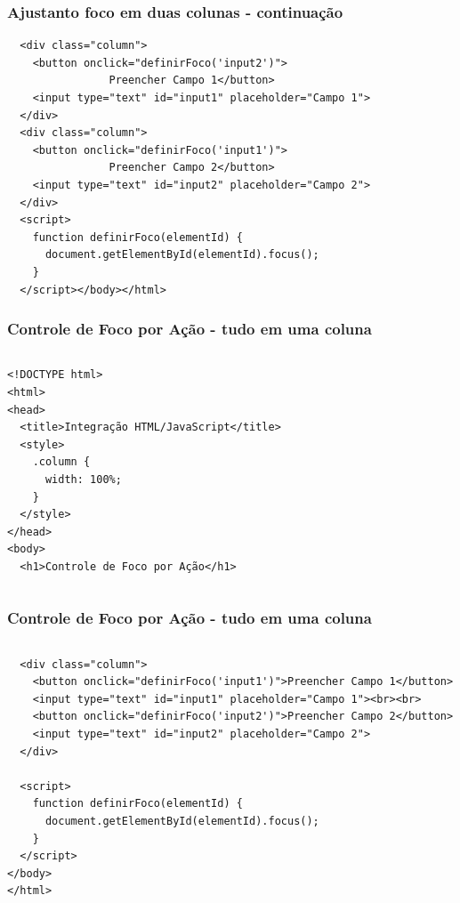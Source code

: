 \documentclass[13pt, xcolor={dvipsnames,svgnames}, portuguese]{beamer}
\begin{document}


\begin{frame}[fragile]
\frametitle{Ajustanto foco em duas colunas - continuação}

\begin{verbatim}
  <div class="column">
    <button onclick="definirFoco('input2')">
    			Preencher Campo 1</button>
    <input type="text" id="input1" placeholder="Campo 1">
  </div>
  <div class="column">
    <button onclick="definirFoco('input1')">
    			Preencher Campo 2</button>
    <input type="text" id="input2" placeholder="Campo 2">
  </div>
  <script>
    function definirFoco(elementId) {
      document.getElementById(elementId).focus();
    }
  </script></body></html>
\end{verbatim}

\end{frame}

\begin{frame}[fragile]
\frametitle{Controle de Foco por Ação - tudo em uma coluna}

\begin{columns}
\begin{verbatim}
<!DOCTYPE html>
<html>
<head>
  <title>Integração HTML/JavaScript</title>
  <style>
    .column {
      width: 100%;
    }
  </style>
</head>
<body>
  <h1>Controle de Foco por Ação</h1>
\end{verbatim}

\end{columns}

\end{frame}

\begin{frame}[fragile]
\frametitle{Controle de Foco por Ação - tudo em uma coluna}

\begin{columns}
\begin{verbatim}
  <div class="column">
    <button onclick="definirFoco('input1')">Preencher Campo 1</button>
    <input type="text" id="input1" placeholder="Campo 1"><br><br>
    <button onclick="definirFoco('input2')">Preencher Campo 2</button>
    <input type="text" id="input2" placeholder="Campo 2">
  </div>

  <script>
    function definirFoco(elementId) {
      document.getElementById(elementId).focus();
    }
  </script>
</body>
</html>
\end{verbatim}

\end{columns}

\end{frame}



\end{document}
